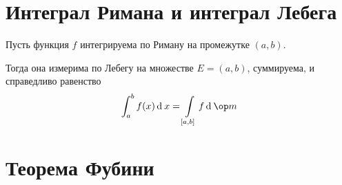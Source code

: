 \section{Интеграл Римана и интеграл Лебега}

\begin{theorem}
	Пусть функция $ f $ интегрируема по Риману на промежутке $ (a, b) $.

	Тогда она измерима по Лебегу на множестве $ E = (a, b) $, суммируема, и справедливо равенство
	$$ \int_a^b f(x) \di x = \int\limits_{[a, b]} f \di \op m $$
\end{theorem}

\begin{noproof}
\end{noproof}

\section{Теорема Фубини}

